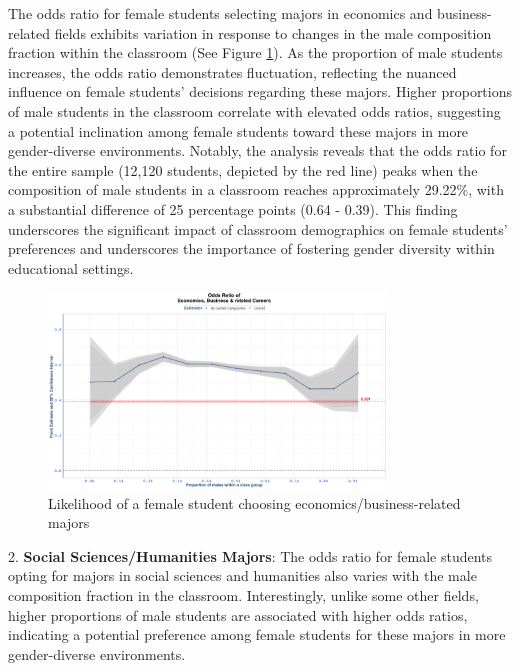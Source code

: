 The odds ratio for female students selecting majors in economics and business-related fields exhibits variation in response to changes in the male composition fraction within the classroom (See Figure \ref{fig:economics_business_related}).  As the proportion of male students increases, the odds ratio demonstrates fluctuation, reflecting the nuanced influence on female students' decisions regarding these majors. Higher proportions of male students in the classroom correlate with elevated odds ratios, suggesting a potential inclination among female students toward these majors in more gender-diverse environments. Notably, the analysis reveals that the odds ratio for the entire sample (12,120 students, depicted by the red line) peaks when the composition of male students in a classroom reaches approximately 29.22\%, with a substantial difference of 25 percentage points (0.64 - 0.39). This finding underscores the significant impact of classroom demographics on female students' preferences and underscores the importance of fostering gender diversity within educational settings.
 
\begin{figure}[H]
\centering
\includegraphics[width=0.8\textwidth]{Graph/Results/fe_panel_student_gender_composition_wome_in_ECONOMICS_BUSINESS_RELATED_bce.png}
\caption{Likelihood of a female student choosing economics/business-related majors}
\label{fig:economics_business_related}
\end{figure}



2. \textbf{Social Sciences/Humanities Majors}: The odds ratio for female students opting for majors in social sciences and humanities also varies with the male composition fraction in the classroom. Interestingly, unlike some other fields, higher proportions of male students are associated with higher odds ratios, indicating a potential preference among female students for these majors in more gender-diverse environments.

